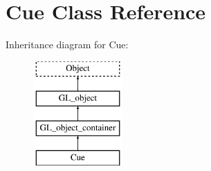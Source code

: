 \hypertarget{class_cue}{
\section{Cue Class Reference}
\label{class_cue}
}
Inheritance diagram for Cue:\begin{figure}[H]
\begin{center}
\leavevmode
\includegraphics[height=4.000000cm]{class_cue}
\end{center}
\end{figure}

